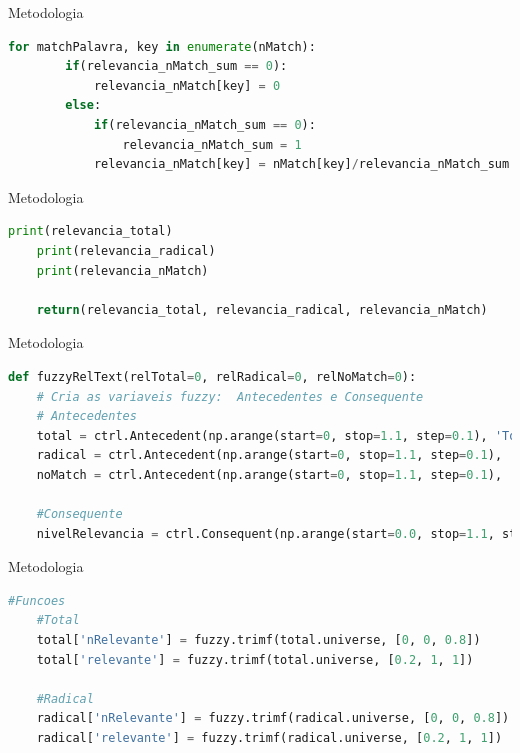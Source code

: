 \documentclass{beamer}
\begin{document}
	\begin{frame}[fragile]{Metodologia}
\begin{lstlisting}[language=Python, caption = Relevância de cada palavra(cont.)]
	for matchPalavra, key in enumerate(nMatch):
		if(relevancia_nMatch_sum == 0):
			relevancia_nMatch[key] = 0
		else:
			if(relevancia_nMatch_sum == 0):
				relevancia_nMatch_sum = 1
			relevancia_nMatch[key] = nMatch[key]/relevancia_nMatch_sum
\end{lstlisting}
	\end{frame}	

	\begin{frame}[fragile]{Metodologia}
\begin{lstlisting}[language=Python, caption = Relevância de uma palavra(cont.)]
	print(relevancia_total)
	print(relevancia_radical)
	print(relevancia_nMatch)
	
	return(relevancia_total, relevancia_radical, relevancia_nMatch)
\end{lstlisting}
	\end{frame}

	\begin{frame}[fragile]{Metodologia}
\begin{lstlisting}[language=Python, caption = Lógica Fuzzy]
def fuzzyRelText(relTotal=0, relRadical=0, relNoMatch=0):
	# Cria as variaveis fuzzy:  Antecedentes e Consequente
	# Antecedentes
	total = ctrl.Antecedent(np.arange(start=0, stop=1.1, step=0.1), 'Total')
	radical = ctrl.Antecedent(np.arange(start=0, stop=1.1, step=0.1), 'Radical')
	noMatch = ctrl.Antecedent(np.arange(start=0, stop=1.1, step=0.1), 'NoMatch')
	
	#Consequente
	nivelRelevancia = ctrl.Consequent(np.arange(start=0.0, stop=1.1, step=0.1), 'Relevancia')
\end{lstlisting}
	\end{frame}

	\begin{frame}[fragile]{Metodologia}
\begin{lstlisting}[language=Python, caption = Lógica Fuzzy]
	#Funcoes
	#Total
	total['nRelevante'] = fuzzy.trimf(total.universe, [0, 0, 0.8])
	total['relevante'] = fuzzy.trimf(total.universe, [0.2, 1, 1])
	
	#Radical
	radical['nRelevante'] = fuzzy.trimf(radical.universe, [0, 0, 0.8])
	radical['relevante'] = fuzzy.trimf(radical.universe, [0.2, 1, 1])
\end{lstlisting}
	\end{frame}
\end{document}
